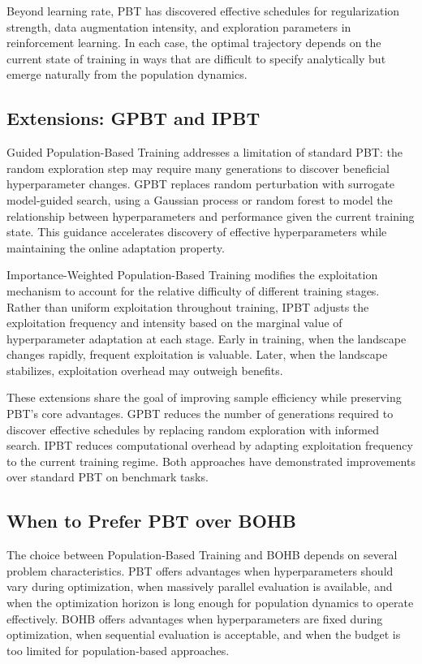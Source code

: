 Beyond learning rate, PBT has discovered effective schedules for regularization strength, data augmentation intensity, and exploration parameters in reinforcement learning. In each case, the optimal trajectory depends on the current state of training in ways that are difficult to specify analytically but emerge naturally from the population dynamics.

\subsection{Extensions: GPBT and IPBT}
\label{subsec:pbt_extensions}

Guided Population-Based Training addresses a limitation of standard PBT: the random exploration step may require many generations to discover beneficial hyperparameter changes. GPBT replaces random perturbation with surrogate model-guided search, using a Gaussian process or random forest to model the relationship between hyperparameters and performance given the current training state. This guidance accelerates discovery of effective hyperparameters while maintaining the online adaptation property.

Importance-Weighted Population-Based Training modifies the exploitation mechanism to account for the relative difficulty of different training stages. Rather than uniform exploitation throughout training, IPBT adjusts the exploitation frequency and intensity based on the marginal value of hyperparameter adaptation at each stage. Early in training, when the landscape changes rapidly, frequent exploitation is valuable. Later, when the landscape stabilizes, exploitation overhead may outweigh benefits.

These extensions share the goal of improving sample efficiency while preserving PBT's core advantages. GPBT reduces the number of generations required to discover effective schedules by replacing random exploration with informed search. IPBT reduces computational overhead by adapting exploitation frequency to the current training regime. Both approaches have demonstrated improvements over standard PBT on benchmark tasks.

\subsection{When to Prefer PBT over BOHB}
\label{subsec:pbt_vs_bohb}

The choice between Population-Based Training and BOHB depends on several problem characteristics. PBT offers advantages when hyperparameters should vary during optimization, when massively parallel evaluation is available, and when the optimization horizon is long enough for population dynamics to operate effectively. BOHB offers advantages when hyperparameters are fixed during optimization, when sequential evaluation is acceptable, and when the budget is too limited for population-based approaches.

